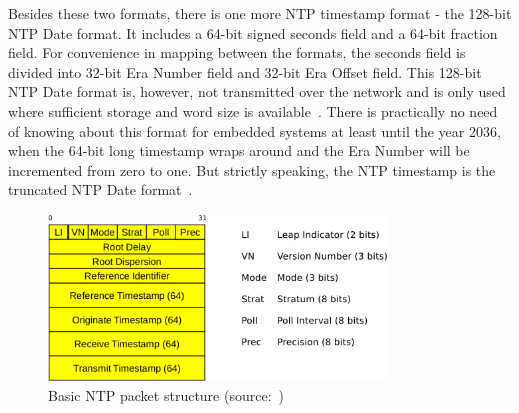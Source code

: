 Besides these two formats, there is one more NTP timestamp format - the 128-bit NTP Date format.
It includes a 64-bit signed seconds field and a 64-bit fraction field.
For convenience in mapping between the formats,
the seconds field is divided into 32-bit Era Number field
and 32-bit Era Offset field.
This 128-bit NTP Date format is, however, not transmitted over the network
and is only used where sufficient storage and word size is available~\cite{rfc5905}.
There is practically no need of knowing about this format for embedded systems
at least until the year 2036, when the 64-bit long timestamp wraps around and
the Era Number will be incremented from zero to one.
But strictly speaking, the NTP timestamp is the truncated NTP Date format~\cite{rfc5905}.

\begin{figure}
	\centering
	\includegraphics[width=9cm,keepaspectratio]{fig/ntp-packet.pdf}
	\caption{Basic NTP packet structure (source:~\cite{ntp-arch})}
	\label{fig:ntp-packet}
	\bigskip
\end{figure}

